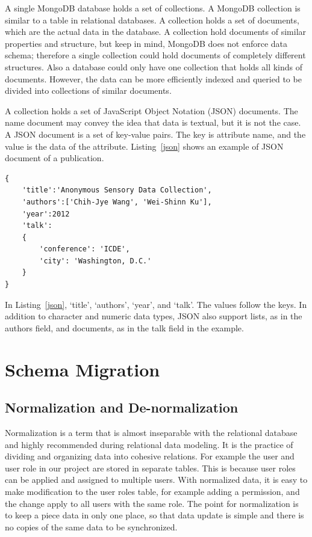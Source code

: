 A single MongoDB database holds a set of collections. A MongoDB collection is similar to a table in relational databases. A collection holds a set of documents, which are the actual data in the database. A collection hold documents of similar properties and structure, but keep in mind, MongoDB does not enforce data schema; therefore a single collection could hold documents of completely different structures. Also a database could only have one collection that holds all kinds of documents. However, the data can be more efficiently indexed and queried to be divided into collections of similar documents.

A collection holds a set of JavaScript Object Notation (JSON) documents. The name document may convey the idea that data is textual, but it is not the case. A JSON document is a set of key-value pairs. The key is attribute name, and the value is the data of the attribute. Listing~\ref{json} shows an example of JSON document of a publication.

\begin{lstlisting}[float,caption=A simple JSON document, label=json]
{
    'title':'Anonymous Sensory Data Collection',
    'authors':['Chih-Jye Wang', 'Wei-Shinn Ku'],
    'year':2012
    'talk':
    {
        'conference': 'ICDE',
        'city': 'Washington, D.C.'
    }
}
\end{lstlisting}

In Listing~\ref{json}, `title', `authors', `year', and `talk'. The values follow the keys. In addition to character and numeric data types, JSON also support lists, as in the authors field, and documents, as in the talk field in the example.


\section{Schema Migration}
\subsection{Normalization and De-normalization}

Normalization is a term that is almost inseparable with the relational database and highly recommended during relational data modeling. It is the practice of dividing and organizing data into cohesive relations. For example the user and user role in our project are stored in separate tables. This is because user roles can be applied and assigned to multiple users. With normalized data, it is easy to make modification to the user roles table, for example adding a permission, and the change apply to all users with the same role. The point for normalization is to keep a piece data in only one place, so that data update is simple and there is no copies of the same data to be synchronized.

